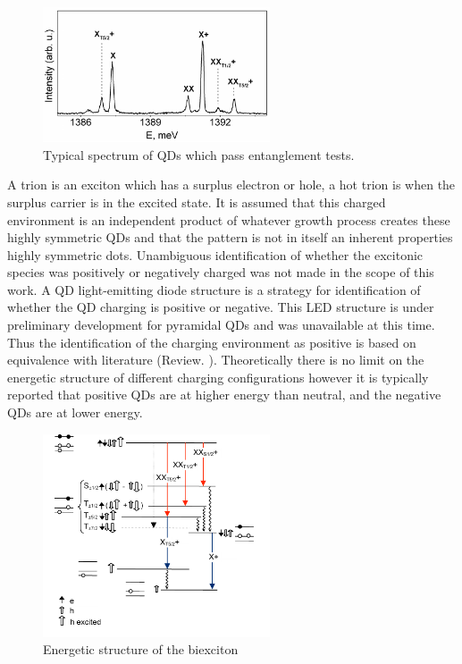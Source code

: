 \documentclass[12pt, twoside]{article}
\numberwithin{equation}{section}
\begin{document}
\begin{figure}[h!]
    \centering
    \includegraphics[width=0.6\textwidth]{images/trionspectrum.pdf}
    \caption[]{Typical spectrum of QDs which pass entanglement tests. \protect\footnotemark}
    \label{fig:trionspectrum}
\end{figure}


A trion is an exciton which has a surplus electron or hole, a hot trion
is when the surplus carrier is in the excited state. It is assumed that
this charged environment is an independent product of whatever growth
process creates these highly symmetric QDs and that the pattern is not
in itself an inherent properties highly symmetric dots. Unambiguous
identification of whether the excitonic species was positively or
negatively charged was not made in the scope of this work. A QD
light-emitting diode structure \cite{baierdiode} is a strategy for
identification of whether the QD charging is positive or negative. This
LED structure is under preliminary development for pyramidal QDs and was
unavailable at this time. Thus the identification of the charging
environment as positive is based on equivalence with literature (Review.
\cite{review}). Theoretically there is no limit on the energetic
structure of different charging configurations however it is typically
reported that positive QDs are at higher energy than neutral, and the
negative QDs are at lower energy.

\begin{figure}[h!]
    \centering
    \includegraphics[width=0.6\textwidth]{images/trionfinestructure.pdf}
    \caption[]{Energetic structure of the biexciton \protect\footnotemark}
    \label{fig:trionfinestructure}
\end{figure}
\end{document}
